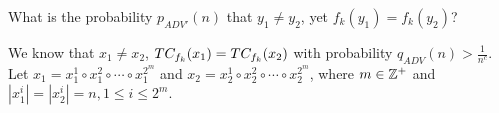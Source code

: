 \documentclass[12pt,twoside]{article}
\begin{document}
What is the probability $p_{ADV'}(n)$ that $y_1 \neq y_2$, yet $f_k(y_1) = 
f_k(y_2)$? 

We know that
$x_1 \neq x_2$, $\merk{x_1}{k} = \merk{x_2}{k}$ with probability $q_{ADV}(n) >
\frac{1}{n^c}$. Let $x_1 = x_1^1\circ x_1^2 \circ \cdots \circ x_1^{2^{m}}$
and $x_2 = x_2^1 \circ x_2^2 \circ \cdots \circ x_2^{2^{m}}$, where $m \in 
\pints$ and $|x_1^i| = |x_2^i| = n, 1 \leq i \leq 2^{m}$.




\end{document}
